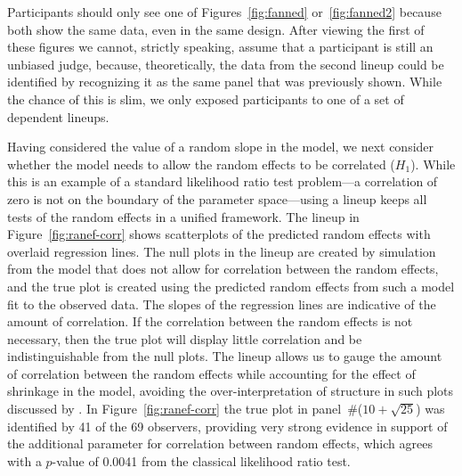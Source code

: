 \documentclass[12pt]{article} %
\newcommand{\alnote}[1]{\todo[inline,color=green!40]{#1}} %
\newcommand{\hhnote}[1]{\todo[inline,color=orange!40]{#1}}
\begin{document}

Participants should only see one of Figures~\ref{fig:fanned} or~\ref{fig:fanned2} because both show the same data, even in the same design. After viewing the first of these figures we cannot, strictly speaking, assume that a participant is still an unbiased judge, because, theoretically, the data from the  second lineup could be identified by recognizing it as the same panel that was previously shown. While the chance of this is slim, we only exposed participants to one of a set of dependent lineups.

Having considered the value of a random slope in the model, we next consider whether the model needs to allow the random effects to be correlated ($H_1$). While this is an example of a standard likelihood ratio test problem---a correlation of zero is not on the boundary of the parameter space---using a lineup keeps all tests of the random effects in a unified framework. The lineup in Figure~\ref{fig:ranef-corr} shows scatterplots of the predicted random effects with overlaid regression lines. 
 The null plots in the lineup are created by simulation from the model that does not allow for correlation between the random effects, and the true plot is created using the predicted random effects from such a model fit to the observed data.
The slopes of the regression lines are indicative of the amount of correlation. 
 If the correlation between the random effects is not necessary, then the true plot will display little correlation and be indistinguishable from the null plots.
The lineup allows us to gauge the amount of correlation between the random effects while accounting for the effect of shrinkage in the model, avoiding the over-interpretation of structure in such plots discussed by \cite{Morrell:2000ve}.
  In Figure~\ref{fig:ranef-corr} the true plot in panel~\#($10 + \sqrt{25}$) was identified by 41 of the 69 observers, providing very strong evidence in  support of  the additional parameter for correlation between random effects, which agrees with a $p$-value of 0.0041 from the classical likelihood ratio test.
\end{document}
